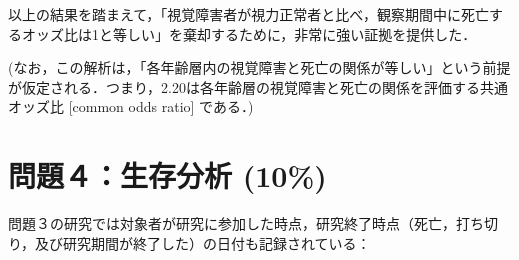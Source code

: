 \documentclass[]{problemset}
\begin{document}
以上の結果を踏まえて，「視覚障害者が視力正常者と比べ，観察期間中に死亡するオッズ比は1と等しい」を棄却するために，非常に強い証拠を提供した．

(なお，この解析は，「各年齢層内の視覚障害と死亡の関係が等しい」という前提が仮定される．つまり，2.20は各年齢層の視覚障害と死亡の関係を評価する共通オッズ比
{[}common odds ratio{]} である．)

\newpage
\vfill

\hypertarget{-10}{%
\section{問題４：生存分析 (10\%)}\label{-10}}

問題３の研究では対象者が研究に参加した時点，研究終了時点（死亡，打ち切り，及び研究期間が終了した）の日付も記録されている：
\end{document}
